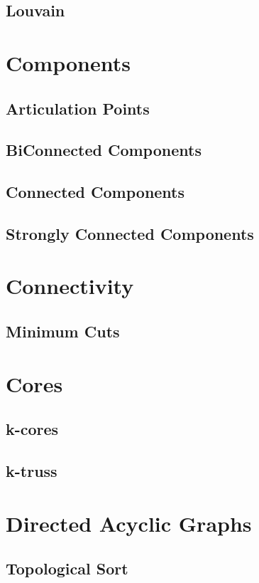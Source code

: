\subsection{Louvain}

\section{Components}
\subsection{Articulation Points}
\subsection{BiConnected Components}
\subsection{Connected Components}
\subsection{Strongly Connected Components}

\section{Connectivity}
\subsection{Minimum Cuts}

\section{Cores}
\subsection{k-cores}
\subsection{k-truss}

\section{Directed Acyclic Graphs}
\subsection{Topological Sort}
